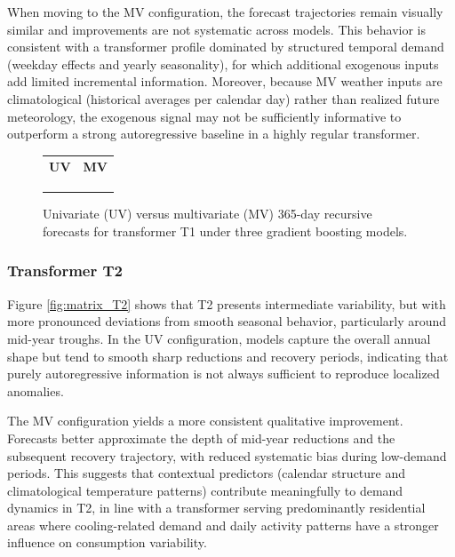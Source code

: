 When moving to the MV configuration, the forecast trajectories remain visually similar and improvements are not systematic across models. This behavior is consistent with a transformer profile dominated by structured temporal demand (weekday effects and yearly seasonality), for which additional exogenous inputs add limited incremental information. Moreover, because MV weather inputs are climatological (historical averages per calendar day) rather than realized future meteorology, the exogenous signal may not be sufficiently informative to outperform a strong autoregressive baseline in a highly regular transformer.

\begin{figure}[!h]
\centering
\setlength{\tabcolsep}{3pt}
\renewcommand{\arraystretch}{1.0}
\begin{tabular}{cc}
\textbf{UV} & \textbf{MV} \\
 &
 \\
 &
 \\
 &
 \\
\end{tabular}
\caption{Univariate (UV) versus multivariate (MV) 365-day recursive forecasts for transformer T1 under three gradient boosting models.}
\label{fig:matrix_T1}
\end{figure}

\subsubsection{Transformer T2}
Figure \ref{fig:matrix_T2} shows that T2 presents intermediate variability, but with more pronounced deviations from smooth seasonal behavior, particularly around mid-year troughs. In the UV configuration, models capture the overall annual shape but tend to smooth sharp reductions and recovery periods, indicating that purely autoregressive information is not always sufficient to reproduce localized anomalies.

The MV configuration yields a more consistent qualitative improvement. Forecasts better approximate the depth of mid-year reductions and the subsequent recovery trajectory, with reduced systematic bias during low-demand periods. This suggests that contextual predictors (calendar structure and climatological temperature patterns) contribute meaningfully to demand dynamics in T2, in line with a transformer serving predominantly residential areas where cooling-related demand and daily activity patterns have a stronger influence on consumption variability.

